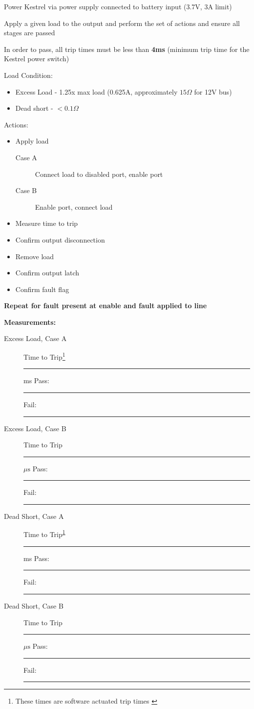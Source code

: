 Power Kestrel via power supply connected to battery input (3.7V, 3A limit)

Apply a given load to the output and perform the set of actions and ensure all stages are passed 

In order to pass, all trip times must be less than \textbf{4ms} (minimum trip time for the Kestrel power switch)

{\large Load Condition:}
\begin{itemize}
\item Excess Load - 1.25x max load (0.625A, approximately $15\Omega$ for 12V bus)
\item Dead short - $<0.1\Omega$
\end{itemize}

{\large Actions: }
\begin{itemize}
\item Apply load
\begin{description}
\item [Case A] Connect load to disabled port, enable port 
\item [Case B] Enable port, connect load
\end{description}
\item Measure time to trip
\item Confirm output disconnection 
\item Remove load
\item Confirm output latch
\item Confirm fault flag
\end{itemize}

\textbf{Repeat for fault present at enable and fault applied to line}

{\Large \textbf{Measurements:}}
\begin{description}
\item [Excess Load, Case A] Time to Trip\footnote{These times are software actuated trip times \label{footnote 1}} \rule{1.5cm}{0.15mm} ms \hfill Pass: \rule{1cm}{0.15mm} \hspace{1cm} Fail: \rule{1cm}{0.15mm}
\item [Excess Load, Case B] Time to Trip \rule{1.5cm}{0.15mm} $\mu \text{s}$ \hfill Pass: \rule{1cm}{0.15mm} \hspace{1cm} Fail: \rule{1cm}{0.15mm}
\item [Dead Short, Case A] Time to Trip\textsuperscript{\ref{footnote 1}} \rule{1.5cm}{0.15mm} ms \hfill Pass: \rule{1cm}{0.15mm} \hspace{1cm} Fail: \rule{1cm}{0.15mm}
\item [Dead Short, Case B] Time to Trip \rule{1.5cm}{0.15mm} $\mu \text{s}$ \hfill Pass: \rule{1cm}{0.15mm} \hspace{1cm} Fail: \rule{1cm}{0.15mm}
\end{description}

